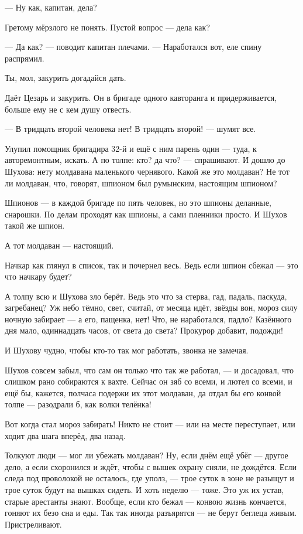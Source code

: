 --- Ну как, капитан, дела?

Гретому мёрзлого не понять. Пустой вопрос --- дела как?

--- Да как? --- поводит капитан плечами. --- Наработался вот, еле спину распрямил.

Ты, мол, закурить догадайся дать.

Даёт Цезарь и закурить. Он в бригаде одного кавторанга и придерживается, больше ему не с кем
душу отвесть.

--- В тридцать второй человека нет! В тридцать второй! --- шумят все.

Улупил помощник бригадира 32-й и ещё с ним парень один --- туда, к авторемонтным, искать. А по
толпе: кто? да что? --- спрашивают. И дошло до Шухова: нету молдавана маленького чернявого.
Какой же это молдаван? Не тот ли молдаван, что, говорят, шпионом был румынским, настоящим
шпионом?

Шпионов --- в каждой бригаде по пять человек, но это шпионы деланные, снарошки. По делам
проходят как шпионы, а сами пленники просто. И Шухов такой же шпион.

А тот молдаван --- настоящий.

Начкар как глянул в список, так и почернел весь. Ведь если шпион сбежал --- это что начкару
будет?

А толпу всю и Шухова зло берёт. Ведь это что за стерва, гад, падаль, паскуда, загребанец? Уж
небо тёмно, свет, считай, от месяца идёт, звёзды вон, мороз силу ночную забирает --- а его,
пащенка, нет! Что, не наработался, падло? Казённого дня мало, одиннадцать часов, от света до
света? Прокурор добавит, подожди!

И Шухову чудно, чтобы кто-то так мог работать, звонка не замечая.

Шухов совсем забыл, что сам он только что так же работал, --- и досадовал, что слишком рано
собираются к вахте. Сейчас он зяб со всеми, и лютел со всеми, и ещё бы, кажется, полчаса
подержи их этот молдаван, да отдал бы его конвой толпе --- разодрали б, как волки телёнка!

Вот когда стал мороз забирать! Никто не стоит --- или на месте переступает, или ходит два шага
вперёд, два назад.

Толкуют люди --- мог ли убежать молдаван? Ну, если днём ещё убёг --- другое дело, а если
схоронился и ждёт, чтобы с вышек охрану сняли, не дождётся. Если следа под проволокой не
осталось, где уполз, --- трое суток в зоне не разыщут и трое суток будут на вышках сидеть. И
хоть неделю --- тоже. Это уж их устав, старые арестанты знают. Вообще, если кто бежал --- конвою
жизнь кончается, гоняют их безо сна и еды. Так так иногда разъярятся --- не берут беглеца
живым. Пристреливают.

